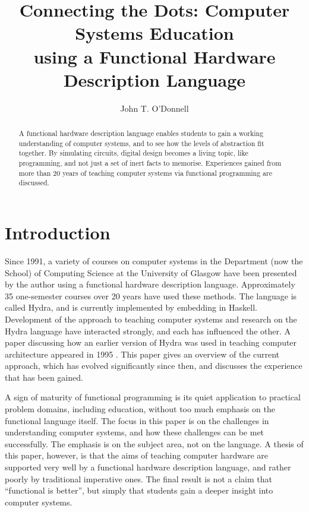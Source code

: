 \documentclass[submission,copyright,creativecommons]{eptcs}
\title{Connecting the Dots: Computer Systems Education\\ using a
  Functional Hardware Description Language}
\author{John T. O'Donnell
  \institute{School of Computing Science\\ University of Glasgow}
  \email{john.odonnell@glasgow.ac.uk}}
\begin{document}
\maketitle

\begin{abstract}
  A functional hardware description language enables students to
  gain a working understanding of computer systems, and to see how
  the levels of abstraction fit together.  By simulating circuits,
  digital design becomes a living topic, like programming, and not
  just a set of inert facts to memorise.  Experiences gained from
  more than 20 years of teaching computer systems via functional
  programming are discussed.
\end{abstract}

\section{Introduction}
\label{sec:introduction}

Since 1991, a variety of courses on computer systems in the Department
(now the School) of Computing Science at the University of Glasgow
have been presented by the author using a functional hardware
description language.  Approximately 35 one-semester courses over 20
years have used these methods.  The language is called Hydra, and is
currently implemented by embedding in Haskell. Development of the
approach to teaching computer systems and research on the Hydra
language have interacted strongly, and each has influenced the other.
A paper discussing how an earlier version of Hydra was used in
teaching computer architecture appeared in 1995
\cite{1995-OD-Hydra-FPLE}.  This paper gives an overview of the
current approach, which has evolved significantly since then, and
discusses the experience that has been gained.

A sign of maturity of functional programming is its quiet
application to practical problem domains, including education,
without too much emphasis on the functional language itself.  The
focus in this paper is on the challenges in understanding computer
systems, and how these challenges can be met successfully.  The
emphasis is on the subject area, not on the language.  A thesis of
this paper, however, is that the aims of teaching computer hardware
are supported very well by a functional hardware description
language, and rather poorly by traditional imperative ones.  The
final result is not a claim that ``functional is better'', but
simply that students gain a deeper insight into computer systems.
\end{document}
